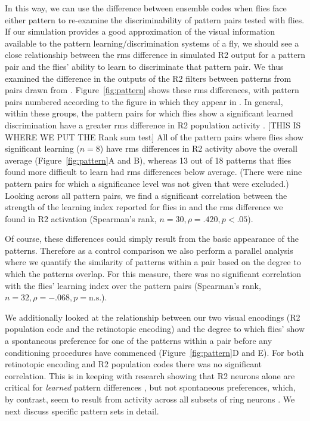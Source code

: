 \documentclass[10pt]{article}
\begin{document}
In this way, we can use the difference between ensemble codes when flies face either pattern to re-examine the discriminability of pattern pairs tested with flies.
If our simulation provides a good approximation of the visual information available to the pattern learning/discrimination systems of a fly, we should see a close relationship between the \ac{rms} difference in simulated R2 output for a pattern pair and the flies' ability to learn to discriminate that pattern pair.
We thus examined the difference in the outputs of the R2 filters between patterns from pairs drawn from \cite{Ernst1999}.
Figure~\ref{fig:pattern} shows these \ac{rms} differences, with pattern pairs numbered according to the figure in which they appear in \cite{Ernst1999}.
In general, within these groups, the pattern pairs for which flies show a significant learned discrimination have a greater \ac{rms} difference in R2 population activity \cite{Ernst1999}.
[THIS IS WHERE WE PUT THE Rank sum test] All of the pattern pairs where flies show significant learning ($n=8$) have \ac{rms} differences in R2 activity above the overall average (Figure~\ref{fig:pattern}A and B), whereas 13 out of 18 patterns that flies found more difficult to learn had \ac{rms} differences below average.
(There were nine pattern pairs for which a significance level was not given that were excluded.)
Looking across all pattern pairs, we find a significant correlation between the strength of the learning index reported for flies in \cite{Ernst1999} and the \ac{rms} difference we found in R2 activation (Spearman's rank, $n=30, \rho=.420, p < .05$).

\begin{comment}
Sig:
above: 8; below: 0; eq: 0; not given: 0; tot: 8
------
NS:
above: 5; below: 13; eq: 0; not given: 1; tot: 19
------
Sig not given:
above: 3; eq: 3; below: 0; not given: 3; tot: 9
------
tot tot: 36
\end{comment}

Of course, these differences could simply result from the basic appearance of the patterns.
Therefore as a control comparison we also perform a parallel analysis where we quantify the similarity of patterns within a pair based on the degree to which the patterns overlap.
For this measure, there was no significant correlation with the flies' learning index over the pattern pairs (Spearman's rank, $n=32, \rho=-.068,p=\mathrm{n.s.}$).

We additionally looked at the relationship between our two visual encodings (R2 population code and the retinotopic encoding) and the degree to which flies' show a spontaneous preference for one of the patterns within a pair before any conditioning procedures have commenced (Figure~\ref{fig:pattern}D and E). For both retinotopic encoding and R2 population codes there was no significant correlation. This is in keeping with research showing that R2 neurons alone are critical for \emph{learned} pattern differences \cite{Ernst1999}, but not spontaneous preferences, which, by contrast, seem to result from activity across all subsets of ring neurons \cite{Solanki2015}.
We next discuss specific pattern sets in detail.
\end{document}
